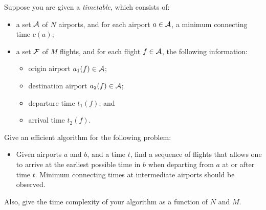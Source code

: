 Suppose you are given a {\em timetable}, which consists of:

\begin{itemize}

\item  a set $\cal  A$ of $N$ airports, and for each airport $a \in  \cal
A$, a minimum connecting time $c(a)$;

\item  a set $\cal  F$ of $M$ flights, and for each flight $f \in  \cal
A$, the following information:

\begin{itemize}

\item  origin airport $a_1(f) \in  \cal  A$;

\item  destination airport $a_2(f) \in  \cal  A$;

\item  departure time $t_1(f)$; and

\item  arrival time $t_2(f)$.

\end{itemize}

\end{itemize}


Give an efficient algorithm for the following problem:

\begin{itemize}

\item[]  Given airports $a$ and $b$, and a time $t$, find a sequence of
flights that allows one to arrive at the earliest possible time in $b$
when departing from $a$ at or after time $t$.
Minimum connecting times at intermediate airports should be observed.

\end{itemize}


Also, give the time complexity of your algorithm as a function of $N$ and $M$.
